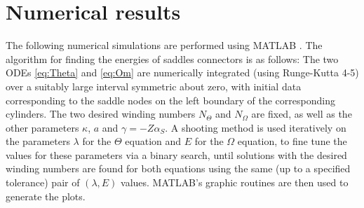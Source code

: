 \documentclass[11 pt]{article}
\renewcommand\({\left(}
\renewcommand\){\right)}
\newcommand\<{\langle}
\renewcommand\>{\rangle}
\newcommand\8{\infty}
\newcommand{\al} {\alpha}\newcommand{\Al}{\Alpha}
\begin{document}




\section{Numerical results}\label{num}
The following numerical simulations are performed {using MATLAB \cite{matlab}.}  The algorithm for finding the energies of saddles connectors is as follows: The two ODEs \eqref{eq:Theta} and \eqref{eq:Om} are numerically integrated (using Runge-Kutta 4-5) over a suitably large interval symmetric about zero, with initial data corresponding to the saddle nodes on the left boundary of the corresponding cylinders. The two desired winding numbers $N_\Theta$ and $N_\Omega$ are fixed, as well as the other parameters $\kappa$, $a$ and $\gamma = -Z\al_S$.  A shooting method is used iteratively on the parameters $\lambda$ for the $\Theta$ equation and $E$ for the $\Omega$ equation, to fine tune the values for these parameters via a binary search, until solutions with the desired winding numbers are found for both equations using the same (up to a specified tolerance) pair of $(\lambda, E)$ values.  MATLAB's graphic routines are then used to generate the plots.
\end{document}

